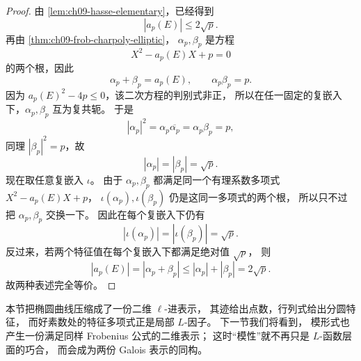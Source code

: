 \begin{proof}
由 \cref{lem:ch09-hasse-elementary}，已经得到
\[
  |a_p(E)|\le 2\sqrt p.
\]
再由 \cref{thm:ch09-frob-charpoly-elliptic}，
$\alpha_p,\beta_p$ 是方程
\[
  X^2-a_p(E)X+p=0
\]
的两个根，因此
\[
  \alpha_p+\beta_p=a_p(E),
  \qquad
  \alpha_p\beta_p=p.
\]
因为 $a_p(E)^2-4p\le 0$，该二次方程的判别式非正，
所以在任一固定的复嵌入下，$\alpha_p,\beta_p$ 互为复共轭。
于是
\[
  |\alpha_p|^2=\alpha_p\overline{\alpha_p}=\alpha_p\beta_p=p,
\]
同理 $|\beta_p|^2=p$，故
\[
  |\alpha_p|=|\beta_p|=\sqrt p.
\]
现在取任意复嵌入 $\iota$。
由于 $\alpha_p,\beta_p$ 都满足同一个有理系数多项式 $X^2-a_p(E)X+p$，
$\iota(\alpha_p),\iota(\beta_p)$ 仍是这同一多项式的两个根，
所以只不过把 $\alpha_p,\beta_p$ 交换一下。
因此在每个复嵌入下仍有
\[
  |\iota(\alpha_p)|=|\iota(\beta_p)|=\sqrt p.
\]
反过来，若两个特征值在每个复嵌入下都满足绝对值 $\sqrt p$，
则
\[
  |a_p(E)|=|\alpha_p+\beta_p|\le |\alpha_p|+|\beta_p|=2\sqrt p.
\]
故两种表述完全等价。 \qedhere
\end{proof}

本节把椭圆曲线压缩成了一份二维 $\ell$-进表示，
其迹给出点数，行列式给出分圆特征，
而好素数处的特征多项式正是局部 $L$-因子。
下一节我们将看到，
模形式也产生一份满足同样 Frobenius 公式的二维表示；
这时“模性”就不再只是 $L$-函数层面的巧合，
而会成为两份 Galois 表示的同构。 
